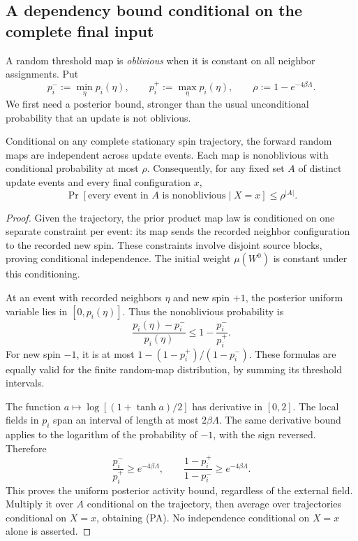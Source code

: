 \subsection{A dependency bound conditional on the complete final input}
\label{resolution-dynamics:conditional-bound}

A random threshold map is \emph{oblivious} when it is constant on
all neighbor assignments. Put
\[
 p_i^-:=\min_\eta p_i(\eta),\qquad
 p_i^+:=\max_\eta p_i(\eta),\qquad
 \rho:=1-e^{-4\beta\Lambda}.
\]
We first need a posterior bound, stronger than the usual unconditional
probability that an update is not oblivious.

\begin{lemma}
\label{lem:resolution-dynamics-posterior-activity}
Conditional on any complete stationary spin trajectory, the forward
random maps are independent across update events. Each map is
nonoblivious with conditional probability at most \(\rho\).
Consequently, for any fixed set \(A\) of distinct update events and
every final configuration \(x\),
\[
 \Pr[\text{every event in }A\text{ is nonoblivious}\mid X=x]
 \le\rho^{|A|}.
 \tag{PA}
\]
\end{lemma}

\begin{proof}
Given the trajectory, the prior product map law is conditioned on one
separate constraint per event: its map sends the recorded neighbor
configuration to the recorded new spin. These constraints involve
disjoint source blocks, proving conditional independence. The initial
weight \(\mu(W^0)\) is constant under this conditioning.

At an event with recorded neighbors \(\eta\) and new spin \(+1\),
the posterior uniform variable lies in \([0,p_i(\eta)]\). Thus the
nonoblivious probability is
\[
 \frac{p_i(\eta)-p_i^-}{p_i(\eta)}
 \le1-\frac{p_i^-}{p_i^+}.
\]
For new spin \(-1\), it is at most
\(1-(1-p_i^+)/(1-p_i^-)\). These formulas are equally valid for
the finite random-map distribution, by summing its threshold intervals.

The function \(a\mapsto\log[(1+\tanh a)/2]\) has derivative in
\([0,2]\). The local fields in \(p_i\) span an interval of length
at most \(2\beta\Lambda\). The same derivative bound applies to
the logarithm of the probability of \(-1\), with the sign reversed.
Therefore
\[
 \frac{p_i^-}{p_i^+}\ge e^{-4\beta\Lambda},\qquad
 \frac{1-p_i^+}{1-p_i^-}\ge e^{-4\beta\Lambda}.
\]
This proves the uniform posterior activity bound, regardless of the
external field. Multiply it over \(A\) conditional on the trajectory,
then average over trajectories conditional on \(X=x\), obtaining
(PA). No independence conditional on \(X=x\) alone is asserted.
\end{proof}

